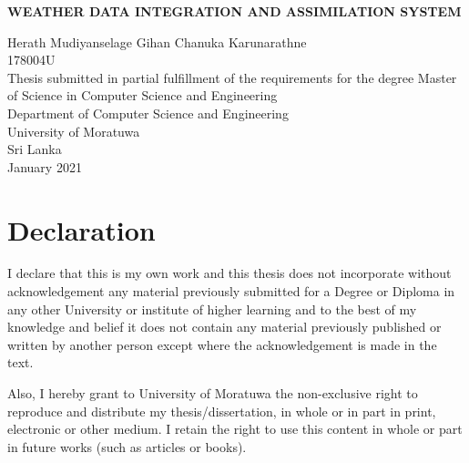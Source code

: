 \documentclass[a4paper,oneside,12pt]{report}
\begin{document}
\begin{titlepage}
    \begin{center}
        \Large{
        \textbf{WEATHER DATA INTEGRATION AND ASSIMILATION SYSTEM}}\\
        \vspace{144pt}
  \large      

        Herath Mudiyanselage Gihan Chanuka Karunarathne\\
        \vspace{24pt}
        178004U\\
         \vspace{72pt}
        \normalsize
        Thesis submitted in partial fulfillment of the requirements for the degree Master of Science in Computer Science and Engineering\\
     
       \vspace{72pt}
        \large
        Department of Computer Science and Engineering\\
        \vspace{24pt}
        University of Moratuwa\\
        Sri Lanka\\
        \vspace{32pt}
        January 2021
        
    \end{center}
\end{titlepage}


\chapter*{Declaration}

I declare that this is my own work and this thesis does not
incorporate without acknowledgement any material previously submitted for a
Degree or Diploma in any other University or institute of higher learning and to
the best of my knowledge and belief it does not contain any material previously
published or written by another person except where the acknowledgement is
made in the text.

Also, I hereby grant to University of Moratuwa the non-exclusive right to
reproduce and distribute my thesis/dissertation, in whole or in part in print,
electronic or other medium. I retain the right to use this content in whole or part
in future works (such as articles or books).
\end{document}
